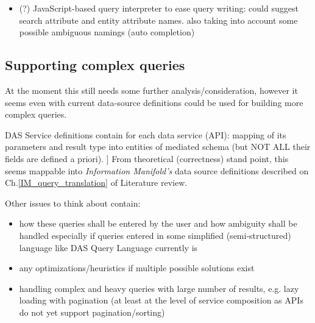 \begin{itemize}
\begin{itemize}
\item knowing all possible APIs parameter values would be beneficial ({\color{red}but not yet sure if available}%
		\footnote{problem: the owners of services may not want to provide direct access to DB because of no trust, security or performance issues. Otherwise, specific APIs could be developed to return possible parameter values but this is quite an overhead}) and could be used to improve the keyword search (better mapping from keywords to API inputs) or even the structured search (e.g. query cleaning/term auto-completion)
\begin{itemize}
\item having direct access to DB, one could incrementally index target database\footnote{%
			E.g. an inverted index of values in Oracle/MySQL DB tables can be built to keep the list of possible terms. For instance, Sphinx full text search engine can access DBs directly and also supports incremental indexing but it needs a bit of manual configuration {http://sphinxsearch.com/docs/current.html\#delta-updates} }%
	tables mapping it's columns into API parameters (manually or automatically). 

\end{itemize}
	\end{itemize}
\item (?) JavaScript-based query interpreter to ease query writing: could suggest search attribute and entity attribute names. also taking into account some possible ambiguous namings (auto completion)
\end{itemize}


\subsection{Supporting complex queries}
{\color{red}At the moment this still needs some further analysis/consideration, however it seems even with current data-source definitions could be used for building more complex queries.}

DAS Service definitions contain for each data service (API): mapping of its parameters and result type into entities of mediated schema (but NOT ALL their fields are defined a priori). ]
From theoretical (correctness) stand point, this seems mappable  into \textit{Information Manifold's} data source definitions described on Ch.\ref{IM_query_translation} of Literature review. 

Other issues to think about contain:
\begin{itemize}
\item how these queries shall be entered by the user and how ambiguity shall be handled especially if queries entered in some simplified (semi-structured) language like DAS Query Language currently is
\item any optimizations/heuristics if multiple possible solutions exist
\item handling complex and heavy queries with large number of results, e.g. lazy loading with pagination (at least at the level of service composition as APIs do not yet support pagination/sorting)
\end{itemize}

